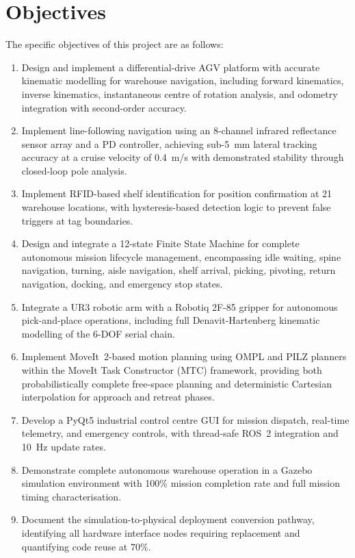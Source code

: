 \documentclass[12pt,a4paper,oneside]{report}
\begin{document}
\section{Objectives}

The specific objectives of this project are as follows:

\begin{enumerate}[label=\arabic*.]
\item Design and implement a differential-drive AGV platform with accurate kinematic modelling for warehouse navigation, including forward kinematics, inverse kinematics, instantaneous centre of rotation analysis, and odometry integration with second-order accuracy.

\item Implement line-following navigation using an 8-channel infrared reflectance sensor array and a PD controller, achieving sub-5~mm lateral tracking accuracy at a cruise velocity of 0.4~m/s with demonstrated stability through closed-loop pole analysis.

\item Implement RFID-based shelf identification for position confirmation at 21 warehouse locations, with hysteresis-based detection logic to prevent false triggers at tag boundaries.

\item Design and integrate a 12-state Finite State Machine for complete autonomous mission lifecycle management, encompassing idle waiting, spine navigation, turning, aisle navigation, shelf arrival, picking, pivoting, return navigation, docking, and emergency stop states.

\item Integrate a UR3 robotic arm with a Robotiq 2F-85 gripper for autonomous pick-and-place operations, including full Denavit-Hartenberg kinematic modelling of the 6-DOF serial chain.

\item Implement MoveIt~2-based motion planning using OMPL and PILZ planners within the MoveIt Task Constructor (MTC) framework, providing both probabilistically complete free-space planning and deterministic Cartesian interpolation for approach and retreat phases.

\item Develop a PyQt5 industrial control centre GUI for mission dispatch, real-time telemetry, and emergency controls, with thread-safe ROS~2 integration and 10~Hz update rates.

\item Demonstrate complete autonomous warehouse operation in a Gazebo simulation environment with 100\% mission completion rate and full mission timing characterisation.

\item Document the simulation-to-physical deployment conversion pathway, identifying all hardware interface nodes requiring replacement and quantifying code reuse at 70\%.
\end{enumerate}
\end{document}
